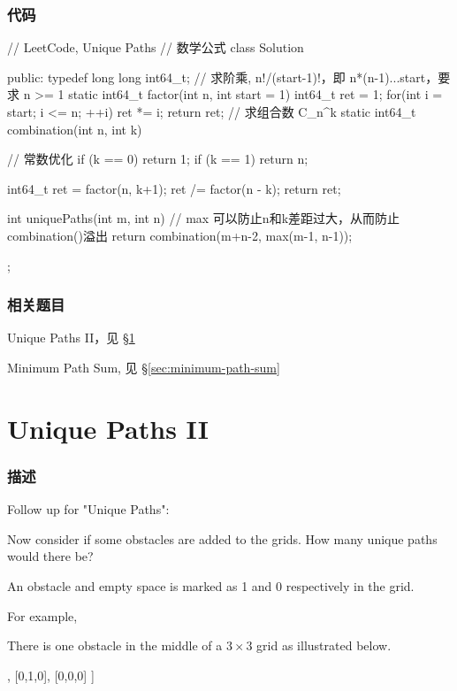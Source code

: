 \subsubsection{代码}
\begin{Code}
	// LeetCode, Unique Paths
	// 数学公式
	class Solution {
		public:
		typedef long long int64_t;
		// 求阶乘, n!/(start-1)!，即 n*(n-1)...start，要求 n >= 1
		static int64_t factor(int n, int start = 1) {
			int64_t  ret = 1;
			for(int i = start; i <= n; ++i)
			ret *= i;
			return ret;
		}
		// 求组合数 C_n^k
		static int64_t combination(int n, int k) {
			// 常数优化
			if (k == 0) return 1;
			if (k == 1) return n;
			
			int64_t ret = factor(n, k+1);
			ret /= factor(n - k);
			return ret;
		}
		
		int uniquePaths(int m, int n) {
			// max 可以防止n和k差距过大，从而防止combination()溢出
			return combination(m+n-2, max(m-1, n-1));
		}
	};
\end{Code}


\subsubsection{相关题目}
\begindot
\item Unique Paths II，见 \S \ref{sec:unique-paths-ii}
\item Minimum Path Sum, 见 \S \ref{sec:minimum-path-sum}
\myenddot


\section{Unique Paths II} %
\label{sec:unique-paths-ii}


\subsubsection{描述}
Follow up for "Unique Paths":

Now consider if some obstacles are added to the grids. How many unique paths would there be?

An obstacle and empty space is marked as 1 and 0 respectively in the grid.

For example,

There is one obstacle in the middle of a $3 \times 3$ grid as illustrated below.
\begin{Code}
	[
	[0,0,0],
	[0,1,0],
	[0,0,0]
	]
\end{Code}

